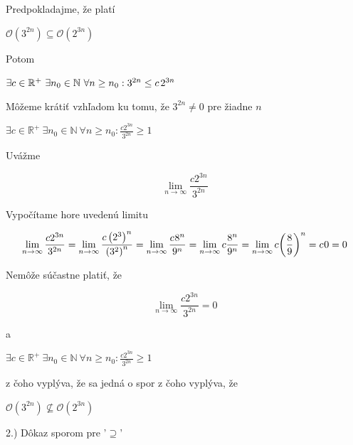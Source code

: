 \documentclass[11pt,a4paper]{article}
\begin{document}
\begin{flushright}
\begin{minipage}{0.92\textwidth}
  Predpokladajme, že platí
  \begin{center}
    $\mathcal{O}(3^{2n}) \subseteq \mathcal{O}(2^{3n})$
  \end{center}
  Potom
  \begin{center}
    $\exists c \in \mathbb{R}^{+} \ \exists n_{0} \in \mathbb{N} \ \forall n \geq n_{0}: 3^{2n} \leq c\hspace{0.5mm}2^{3n}$
  \end{center}
  Môžeme krátiť vzhľadom ku tomu, že $3^{2n} \neq 0$ pre žiadne $n$
  \begin{center}
    $\exists c \in \mathbb{R}^{+} \ \exists n_{0} \in \mathbb{N} \ \forall n \geq n_{0}: \frac{c2^{3n}}{3^{2n}} \geq 1$
  \end{center}
  Uvážme\\[-3.5em]
  \begin{center}
    $$\lim_{n\to\infty} \frac{c2^{3n}}{3^{2n}}$$
  \end{center}
  Vypočítame hore uvedenú limitu\\[-3.5em]
  \begin{center}
    $$\lim_{n\to\infty} \frac{c2^{3n}}{3^{2n}} = \lim_{n\to\infty} \frac{c\left(2^3\right)^n}{\left(3^2\right)^n} = \lim_{n\to\infty} \frac{c\hspace{0.2mm}8^n}{9^n} = \lim_{n\to\infty} c\frac{8^n}{9^n} = \lim_{n\to\infty} c{\left({\frac{8}{9}}\right)}^n = c\hspace{0.2mm}0 = 0$$
  \end{center}
  Nemôže súčastne platiť, že\\[-3.5em]
  \begin{center}
    $$\lim_{n\to\infty} \frac{c2^{3n}}{3^{2n}} = 0$$
  \end{center}
  a
  \begin{center}
    $\exists c \in \mathbb{R}^{+} \ \exists n_{0} \in \mathbb{N} \ \forall n \geq n_{0}: \frac{c2^{3n}}{3^{2n}} \geq 1$
  \end{center}
  z čoho vyplýva, že sa jedná o spor z čoho vyplýva, že
  \begin{center}
    $\mathcal{O}(3^{2n}) \nsubseteq \mathcal{O}(2^{3n})$
  \end{center}
\end{minipage}
\end{flushright}

\hspace{5mm}2.) Dôkaz sporom pre '$\supseteq$'
\end{document}
